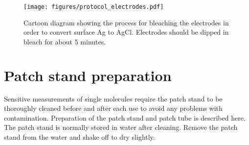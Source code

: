 \begin{figure}[h]
\begin{centering}
\texttt{[image: figures/protocol\_electrodes.pdf]}
\caption[Preparing silver chloride electrodes]{Cartoon diagram showing the process for bleaching the electrodes in order to convert surface Ag to AgCl.  Electrodes should be dipped in bleach for about 5 minutes.}
\label{fig:protocol_electrodes}
\end{centering}
\end{figure}

\section{Patch stand preparation}

Sensitive measurements of single molecules require the patch stand to be thoroughly cleaned before and after each use to avoid any problems with contamination.  Preparation of the patch stand and patch tube is described here.  The patch stand is normally stored in water after cleaning.  Remove the patch stand from the water and shake off to dry slightly.

